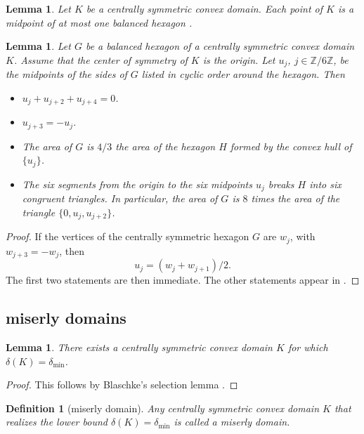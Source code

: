 \documentclass[11pt]{amsart}
\newtheorem{definition}[equation]{Definition}
\newtheorem{lemma}[equation]{Lemma}
\newcommand{\ring}[1]{\mathbb{#1}}
\def\deltalat{\mathbb\delta}  %
\def\delt{\delta_{\min}}
\begin{document}
\begin{lemma}\label{lemma:mid1} 
  Let $K$ be a centrally symmetric convex domain.  Each point of $K$
  is a midpoint of at most one balanced hexagon \cite[p.228]{R}.
\end{lemma}



\begin{lemma}\label{lemma:8G} 
  Let $G$ be a balanced hexagon of a centrally symmetric convex domain
  $K$.  Assume that the center of symmetry of $K$ is the origin.  Let
  $u_j$, $j\in \ring{Z}/6\ring{Z}$, be the midpoints of the sides of
  $G$ listed in cyclic order around the hexagon.  Then
 \begin{itemize}
 \item $u_j+u_{j+2}+u_{j+4}=0$.
 \item $u_{j+3} = -u_j$.
 \item The area of $G$ is $4/3$ the area of the hexagon 
     $H$ formed by the convex hull of $\{u_j\}$.
  \item The six segments from the origin to the six midpoints $u_j$ breaks
    $H$ into six congruent triangles.  In particular, the area of $G$
    is $8$ times the area of the triangle $\{0,u_j,u_{j+2}\}$.
  \end{itemize}
\end{lemma}

\begin{proof} If the vertices of the centrally symmetric hexagon $G$
  are $w_j$, with $w_{j+3} = - w_j$, then
$$u_j = (w_j+w_{j+1})/2.$$
The first two statements are then immediate.  The other statements appear in 
\cite[p.219,p.222]{R}.
\end{proof}


\subsection{miserly domains}

\begin{lemma}  There exists a centrally symmetric convex domain
$K$ for which $\deltalat(K) = \delt$.
\end{lemma}

\begin{proof} This follows by Blaschke's selection lemma \cite[p.220]{R}.
\end{proof}
%
\begin{definition}[miserly domain]
  Any centrally symmetric convex domain $K$ that realizes the lower
  bound $\deltalat(K) = \delt$ is called a {\it miserly
    domain}. %
\end{definition}
\end{document}
